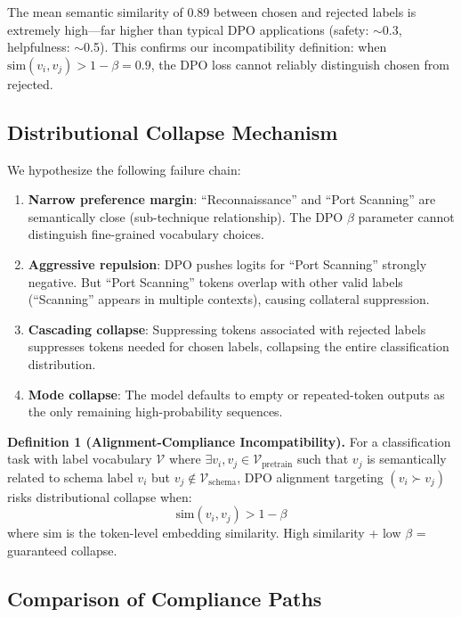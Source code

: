 \documentclass[journal]{IEEEtran}
\begin{document}
The mean semantic similarity of 0.89 between chosen and rejected labels is extremely high---far higher than typical DPO applications (safety: $\sim$0.3, helpfulness: $\sim$0.5). This confirms our incompatibility definition: when $\text{sim}(v_i, v_j) > 1 - \beta = 0.9$, the DPO loss cannot reliably distinguish chosen from rejected.

\subsection{Distributional Collapse Mechanism}
We hypothesize the following failure chain:

\begin{enumerate}
\item \textbf{Narrow preference margin}: ``Reconnaissance'' and ``Port Scanning'' are semantically close (sub-technique relationship). The DPO $\beta$ parameter cannot distinguish fine-grained vocabulary choices.
\item \textbf{Aggressive repulsion}: DPO pushes logits for ``Port Scanning'' strongly negative. But ``Port Scanning'' tokens overlap with other valid labels (``Scanning'' appears in multiple contexts), causing collateral suppression.
\item \textbf{Cascading collapse}: Suppressing tokens associated with rejected labels suppresses tokens needed for chosen labels, collapsing the entire classification distribution.
\item \textbf{Mode collapse}: The model defaults to empty or repeated-token outputs as the only remaining high-probability sequences.
\end{enumerate}

\noindent\textbf{Definition 1 (Alignment-Compliance Incompatibility).} For a classification task with label vocabulary $\mathcal{V}$ where $\exists v_i, v_j \in \mathcal{V}_\text{pretrain}$ such that $v_j$ is semantically related to schema label $v_i$ but $v_j \notin \mathcal{V}_\text{schema}$, DPO alignment targeting $(v_i \succ v_j)$ risks distributional collapse when:
\begin{equation}
\text{sim}(v_i, v_j) > 1 - \beta
\end{equation}
where $\text{sim}$ is the token-level embedding similarity. High similarity + low $\beta$ = guaranteed collapse.

\subsection{Comparison of Compliance Paths}
\end{document}

